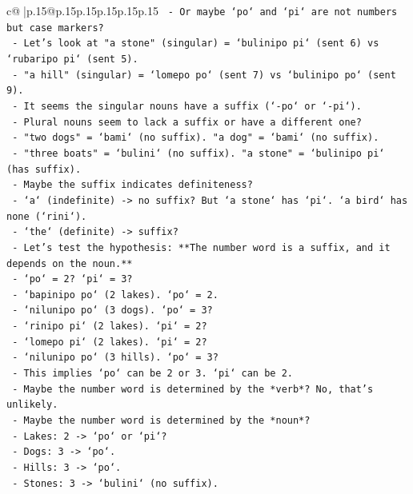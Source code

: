 \documentclass{article}
\begin{document}
{\begin{supertabular}{c@{$\;$}|p{.15\linewidth}@{}p{.15\linewidth}p{.15\linewidth}p{.15\linewidth}p{.15\linewidth}p{.15\linewidth}}
{{{\texttt{   {-} Or maybe `po` and `pi` are not numbers but case markers?} \\
\texttt{   {-} Let's look at "a stone" (singular) = `bulinipo pi` (sent 6) vs `rubaripo pi` (sent 5).} \\
\texttt{   {-} "a hill" (singular) = `lomepo po` (sent 7) vs `bulinipo po` (sent 9).} \\
\texttt{   {-} It seems the singular nouns have a suffix (`{-}po` or `{-}pi`).} \\
\texttt{   {-} Plural nouns seem to lack a suffix or have a different one?} \\
\texttt{   {-} "two dogs" = `bami` (no suffix). "a dog" = `bami` (no suffix).} \\
\texttt{   {-} "three boats" = `bulini` (no suffix). "a stone" = `bulinipo pi` (has suffix).} \\
\texttt{   {-} Maybe the suffix indicates definiteness?} \\
\texttt{     {-} `a` (indefinite) {-}> no suffix? But `a stone` has `pi`. `a bird` has none (`rini`).} \\
\texttt{     {-} `the` (definite) {-}> suffix?} \\
\texttt{   {-} Let's test the hypothesis: **The number word is a suffix, and it depends on the noun.**} \\
\texttt{     {-} `po` = 2? `pi` = 3?} \\
\texttt{     {-} `bapinipo po` (2 lakes). `po` = 2.} \\
\texttt{     {-} `nilunipo po` (3 dogs). `po` = 3?} \\
\texttt{     {-} `rinipo pi` (2 lakes). `pi` = 2?} \\
\texttt{     {-} `lomepo pi` (2 lakes). `pi` = 2?} \\
\texttt{     {-} `nilunipo po` (3 hills). `po` = 3?} \\
\texttt{   {-} This implies `po` can be 2 or 3. `pi` can be 2.} \\
\texttt{   {-} Maybe the number word is determined by the *verb*? No, that's unlikely.} \\
\texttt{   {-} Maybe the number word is determined by the *noun*?} \\
\texttt{     {-} Lakes: 2 {-}> `po` or `pi`?} \\
\texttt{     {-} Dogs: 3 {-}> `po`.} \\
\texttt{     {-} Hills: 3 {-}> `po`.} \\
\texttt{     {-} Stones: 3 {-}> `bulini` (no suffix).} \\
}}}
\end{supertabular}}
\end{document}
